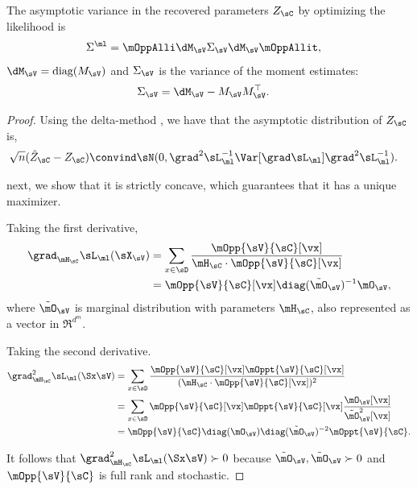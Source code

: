 \begin{lemma}
  \label{lem:pw-variance}
  The asymptotic variance in the recovered parameters $Z_{\sC}$ by optimizing the likelihood is
  \begin{align*}
    \Sigma^{\ml} &= \mOppAlli \dM_\sV \Sigma_\sV \dM_\sV \mOppAllit,
  \end{align*}
  $\dM_\sV = \text{diag}(M_\sV)$ and
  $\Sigma_\sV$ is the variance of the moment estimates:
  \begin{align*}
    \Sigma_\sV &= \dM_\sV - M_\sV M_\sV^\top.
  \end{align*}
\end{lemma}
\begin{proof}
  Using the delta-method \cite{vaart98asymptotic}, we have that the
  asymptotic distribution of $Z_\sC$ is,
  \begin{align*}
    \sqrt{n}(\hat Z_{\sC} - Z_{\sC}) &\convind \sN( 0, \grad^2 \sL_\ml^{-1} \Var[\grad \sL_\ml] \grad^2 \sL_\ml^{-1}).
  \end{align*}

next, we show that it is
strictly concave, which guarantees that it has a unique maximizer.
  
Taking the first derivative,
\begin{align}
  \grad_{\mH_\sC} \sL_\ml(\sX_\sV) 
  &= \sum_{x \in \sD} \frac{\mOpp{\sV}{\sC}[\vx]}{\mH_\sC \cdot \mOpp{\sV}{\sC}[\vx]} \nonumber \\ 
  &= \mOpp{\sV}{\sC}[\vx] \diag(\tilde \mO_{\sV})^{-1} \mO_{\sV}, \label{eqn:lhood-grad}
\end{align}
where $\tilde \mO_\sV$ is marginal distribution with parameters $\mH_\sC$, also represented as a vector in $\Re^{d^m}$.

Taking the second derivative.
\begin{align}
  \grad^2_{\mH_\sC} \sL_\ml(\Sx \sV) 
  &= \sum_{x \in \sD} \frac{\mOpp{\sV}{\sC}[\vx] \mOppt{\sV}{\sC}[\vx]}{(\mH_\sC \cdot \mOpp{\sV}{\sC}[\vx])^2} \nonumber \\
  &= \sum_{x \in \sD}\mOpp{\sV}{\sC}[\vx] \mOppt{\sV}{\sC}[\vx] \frac{\mO_{\sV}[\vx]}{\tilde \mO_{\sV}^2[\vx]} \nonumber \\
  &= \mOpp{\sV}{\sC} \diag(\mO_{\sV}) \diag(\tilde \mO_{\sV})^{-2} \mOppt{\sV}{\sC}. \label{eqn:lhood-hess}%
\end{align}

It follows that $\grad^2_{\mH_\sC} \sL_\ml(\Sx \sV) \succ 0$ because
$\tilde \mO_\sV, \tilde \mO_\sV \succ 0$ and $\mOpp{\sV}{\sC}$ is
full rank and stochastic.



\end{proof}
